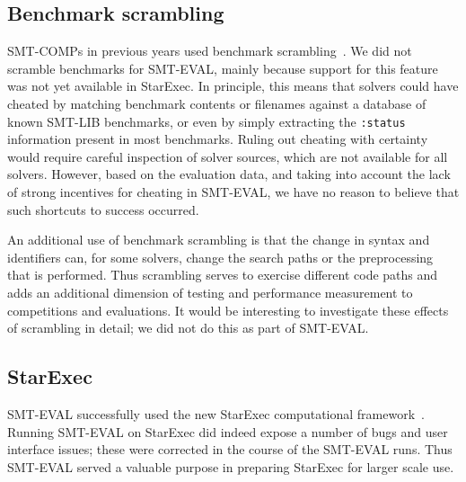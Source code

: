 \documentclass[smallcondensed]{svjour3}
\begin{document}
\subsection{Benchmark scrambling}

SMT-COMPs in previous years used benchmark scrambling~\cite{springerlink:10.1007/s10817-012-9246-5}.  We
did not scramble benchmarks for SMT-EVAL, mainly because support for
this feature was not yet available in StarExec.  In principle, this
means that solvers could have cheated by matching benchmark contents
or filenames against a database of known SMT-LIB benchmarks, or even
by simply extracting the {\tt :status} information present in most
benchmarks.  Ruling out cheating with certainty would require careful
inspection of solver sources, which are not available for all solvers.
However, based on the evaluation data, and taking into account the
lack of strong incentives for cheating in SMT-EVAL, we have no reason
to believe that such shortcuts to success occurred.

An additional use of benchmark scrambling is that the change in syntax
and identifiers can, for some solvers, change the search paths or the
preprocessing that is performed. Thus scrambling serves to exercise
different code paths and adds an additional dimension of testing and
performance measurement to competitions and evaluations. It would be
interesting to investigate these effects of scrambling in detail; we
did not do this as part of SMT-EVAL.


\subsection{StarExec}

SMT-EVAL successfully used the new StarExec computational framework~\cite{webStarExec,StuST-IJCAR-14}. Running SMT-EVAL on StarExec did indeed expose a number of bugs and user interface issues; these were corrected in the course of the SMT-EVAL runs. Thus SMT-EVAL served a valuable purpose in preparing StarExec for larger scale use.
\end{document}
